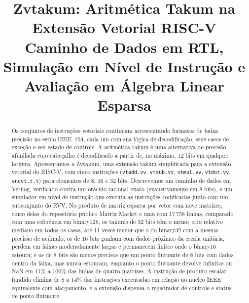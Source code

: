 \documentclass[conference]{IEEEtran}
\newcommand{\code}[1]{\texttt{#1}}
\begin{document}
\title{Zvtakum: Aritmética Takum na Extensão Vetorial RISC-V\\
{\large Caminho de Dados em RTL, Simulação em Nível de Instrução e Avaliação em Álgebra Linear Esparsa}}

\author{
}

\maketitle

\begin{abstract}
Os conjuntos de instruções vetoriais continuam acrescentando formatos de baixa precisão no estilo
IEEE~754, cada um com sua lógica de decodificação, seus casos de exceção e seu estado de controle. A
aritmética takum é uma alternativa de precisão afunilada cujo cabeçalho é decodificado a partir de, no
máximo, 12 bits em qualquer largura. Apresentamos a Zvtakum, uma extensão takum simplificada para a
extensão vetorial do RISC-V, com cinco instruções (\code{vtadd.vv}, \code{vtsub.vv}, \code{vtmul.vv},
\code{vtdot.vv}, \code{vncvt.t.t}) para elementos de 8, 16 e 32 bits. Descrevemos um caminho de dados em
Verilog, verificado contra um oráculo racional exato (exaustivamente em 8 bits), e um simulador em nível
de instrução que executa as instruções codificadas junto com um subconjunto do RVV. No produto de matriz
esparsa por vetor com nove matrizes, cinco delas do repositório público Matrix Market e uma com 17\,758
linhas, comparado com uma referência
em binary128, os takums de 32 bits têm o menor erro relativo mediano em todos os casos, até 11 vezes menor
que o do binary32 com a mesma precisão de acúmulo; os de 16 bits ganham com dados próximos da escala
unitária, perdem em faixas moderadamente largas e permanecem finitos onde o binary16 estoura; e os de 8
bits são menos precisos que um ponto flutuante de 8 bits com dados dentro da faixa, mas nunca estouram,
enquanto o ponto flutuante devolve infinitos ou NaN em 11\% a 100\% das linhas de quatro matrizes. A instrução de produto escalar fundido
elimina de 8 a 14\% das instruções executadas em relação ao núcleo IEEE equivalente com alargamento, e a
extensão dispensa o registrador de controle e status de ponto flutuante.
\end{abstract}
\end{document}
